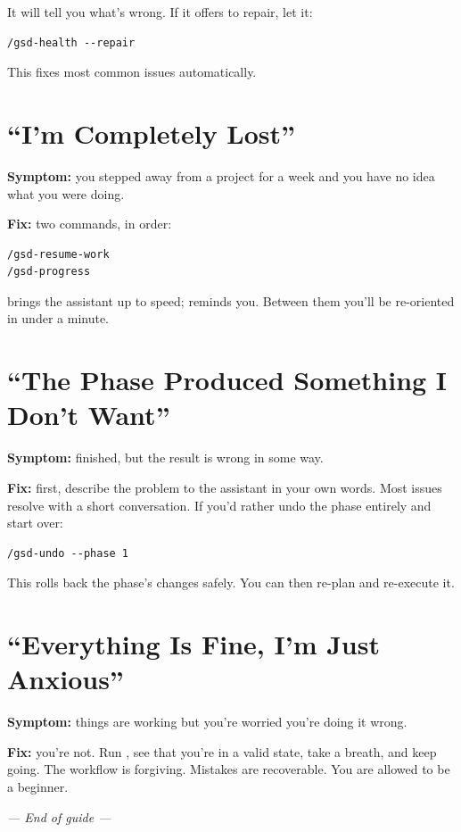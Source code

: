 \documentclass[11pt,letterpaper,openany]{book}
\begin{document}
It will tell you what's wrong. If it offers to repair, let it:

\begin{lstlisting}
/gsd-health --repair
\end{lstlisting}

This fixes most common issues automatically.

\section{``I'm Completely Lost''}

\textbf{Symptom:} you stepped away from a project for a week and you
have no idea what you were doing.

\textbf{Fix:} two commands, in order:

\begin{lstlisting}
/gsd-resume-work
/gsd-progress
\end{lstlisting}

 brings the assistant up to speed; 
reminds you. Between them you'll be re-oriented in under a minute.

\section{``The Phase Produced Something I Don't Want''}

\textbf{Symptom:}  finished, but the result is
wrong in some way.

\textbf{Fix:} first, describe the problem to the assistant in your
own words. Most issues resolve with a short conversation. If you'd
rather undo the phase entirely and start over:

\begin{lstlisting}
/gsd-undo --phase 1
\end{lstlisting}

This rolls back the phase's changes safely. You can then re-plan and
re-execute it.

\section{``Everything Is Fine, I'm Just Anxious''}

\textbf{Symptom:} things are working but you're worried you're doing
it wrong.

\textbf{Fix:} you're not. Run , see that you're in
a valid state, take a breath, and keep going. The workflow is
forgiving. Mistakes are recoverable. You are allowed to be a
beginner.

\bigskip
\begin{center}
\textit{--- End of guide ---}
\end{center}
\end{document}
